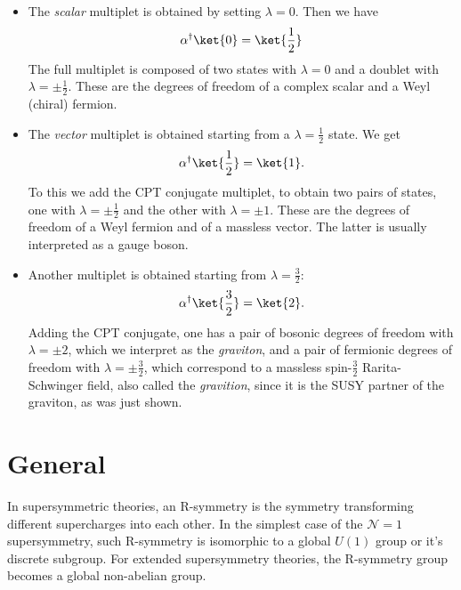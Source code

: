 \begin{example}
  \mbox{}
  \begin{itemize}
    \item The \textit{scalar} multiplet is obtained by setting $\lambda =0$.
      Then we have 
      \begin{equation}
        \alpha^\dagger\ket{0} = \ket{\frac{1}{2}}
      \end{equation}
      The full multiplet is composed of two states with $\lambda = 0 $ and
      a doublet with $\lambda = \pm\frac{1}{2}$. These are the degrees of
      freedom of a complex scalar and a Weyl (chiral) fermion.
    \item The \textit{vector} multiplet is obtained starting from a $\lambda
      = \frac{1}{2}$ state. We get
      \begin{equation}
        \alpha^\dagger\ket{\frac{1}{2}} = \ket{1}.
      \end{equation}
      To this we add the CPT conjugate multiplet, to obtain two pairs of
      states, one with $\lambda = \pm\frac{1}{2}$ and the other with $\lambda
      = \pm 1$. These are the degrees of freedom of a Weyl fermion and of
      a massless vector. The latter is usually interpreted as a gauge boson.
    \item Another multiplet is obtained starting from $\lambda = \frac{3}{2}$:
      \begin{equation}
        \alpha^\dagger\ket{\frac{3}{2}} = \ket{2}.
      \end{equation}
      Adding the CPT conjugate, one has a pair of bosonic degrees of freedom
      with $\lambda = \pm 2$, which we interpret as the \textit{graviton}, and
      a pair of fermionic degrees of freedom with $\lambda =\pm\frac{3}{2}$,
      which correspond to a massless spin-$\frac{3}{2}$ Rarita-Schwinger field,
      also called the \textit{gravition}, since it is the SUSY partner of the
      graviton, as was just shown.
  \end{itemize}
\end{example}
\section{General}
\begin{definition}[R-symmetry]
In supersymmetric theories, an R-symmetry is the symmetry transforming different supercharges into each other. In the simplest case of the $\mathcal{N}=1$ supersymmetry, such R-symmetry is isomorphic to a global $U(1)$ group or it's discrete subgroup. For extended supersymmetry theories, the R-symmetry group becomes a global non-abelian group.  
\end{definition}


